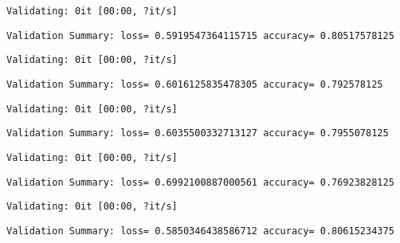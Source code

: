 \documentclass[11pt]{article}
\begin{document}
    
    \begin{Verbatim}[commandchars=\\\{\}]
Validating: 0it [00:00, ?it/s]
    \end{Verbatim}

    
    \begin{Verbatim}[commandchars=\\\{\}]
Validation Summary: loss= 0.5919547364115715 accuracy= 0.80517578125
    \end{Verbatim}

    
    \begin{Verbatim}[commandchars=\\\{\}]
Validating: 0it [00:00, ?it/s]
    \end{Verbatim}

    
    \begin{Verbatim}[commandchars=\\\{\}]
Validation Summary: loss= 0.6016125835478305 accuracy= 0.792578125
    \end{Verbatim}

    
    \begin{Verbatim}[commandchars=\\\{\}]
Validating: 0it [00:00, ?it/s]
    \end{Verbatim}

    
    \begin{Verbatim}[commandchars=\\\{\}]
Validation Summary: loss= 0.6035500332713127 accuracy= 0.7955078125
    \end{Verbatim}

    
    \begin{Verbatim}[commandchars=\\\{\}]
Validating: 0it [00:00, ?it/s]
    \end{Verbatim}

    
    \begin{Verbatim}[commandchars=\\\{\}]
Validation Summary: loss= 0.6992100887000561 accuracy= 0.76923828125
    \end{Verbatim}

    
    \begin{Verbatim}[commandchars=\\\{\}]
Validating: 0it [00:00, ?it/s]
    \end{Verbatim}

    
    \begin{Verbatim}[commandchars=\\\{\}]
Validation Summary: loss= 0.5850346438586712 accuracy= 0.80615234375
    \end{Verbatim}
\end{document}
